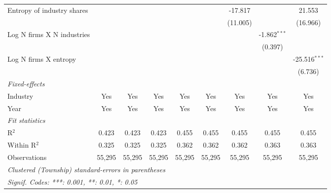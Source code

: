 \begin{tabular}{lcccccccc}
   Entropy of industry shares                            &                 &                 &                 &                  &                  & -17.817          &                  & 21.553\\   
                                                         &                 &                 &                 &                  &                  & (11.005)         &                  & (16.966)\\   
   Log N firms X N industries                            &                 &                 &                 &                  &                  &                  & -1.862$^{***}$   &   \\   
                                                         &                 &                 &                 &                  &                  &                  & (0.397)          &   \\   
   Log N firms X entropy                                 &                 &                 &                 &                  &                  &                  &                  & -25.516$^{***}$\\   
                                                         &                 &                 &                 &                  &                  &                  &                  & (6.736)\\   
   \midrule
   \emph{Fixed-effects}\\
   Industry                                              & Yes             & Yes             & Yes             & Yes              & Yes              & Yes              & Yes              & Yes\\  
   Year                                                  & Yes             & Yes             & Yes             & Yes              & Yes              & Yes              & Yes              & Yes\\  
   \midrule
   \emph{Fit statistics}\\
   R$^2$                                                 & 0.423           & 0.423           & 0.423           & 0.455            & 0.455            & 0.455            & 0.455            & 0.455\\  
   Within R$^2$                                          & 0.325           & 0.325           & 0.325           & 0.362            & 0.362            & 0.362            & 0.363            & 0.363\\  
   Observations                                          & 55,295          & 55,295          & 55,295          & 55,295           & 55,295           & 55,295           & 55,295           & 55,295\\  
   \midrule \midrule
   \multicolumn{9}{l}{\emph{Clustered (Township) standard-errors in parentheses}}\\
   \multicolumn{9}{l}{\emph{Signif. Codes: ***: 0.001, **: 0.01, *: 0.05}}\\
\end{tabular}
\par\endgroup
